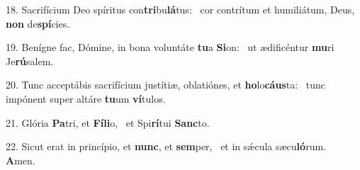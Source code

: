 18. Sacrifícium Deo spíritus con\textbf{tri}bu\textbf{lá}tus: \ast\  cor contrítum et humiliátum, Deus, \textbf{non} de\textbf{spí}cies.\

19. Benígne fac, Dómine, in bona voluntáte \textbf{tu}a \textbf{Si}on: \ast\  ut ædificéntur \textbf{mu}ri Je\textbf{rú}salem.\

20. Tunc acceptábis sacrifícium justítiæ, oblatiónes, et \textbf{ho}lo\textbf{cáus}ta: \ast\  tunc impónent super altáre \textbf{tu}um \textbf{ví}tulos.\

21. Glória \textbf{Pa}tri, et \textbf{Fí}\textbf{li}o, \ast\  et Spi\textbf{rí}tui \textbf{Sanc}to.\

22. Sicut erat in princípio, et \textbf{nunc}, et \textbf{sem}per, \ast\  et in sǽcula sæcu\textbf{ló}rum. \textbf{A}men.\

